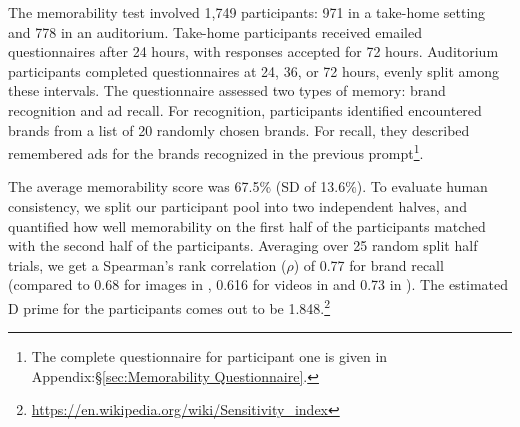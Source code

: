 The memorability test involved 1,749 participants: 971 in a take-home setting and 778 in an auditorium. Take-home participants received emailed questionnaires after 24 hours, with responses accepted for 72 hours. Auditorium participants completed questionnaires at 24, 36, or 72 hours, evenly split among these intervals. The questionnaire assessed two types of memory: brand recognition and ad recall. For recognition, participants identified encountered brands from a list of 20 randomly chosen brands. For recall, they described remembered ads for the brands recognized in the previous prompt\footnote{The complete questionnaire for participant one is given in Appendix:\S\ref{sec:Memorability Questionnaire}.}. 

The average memorability score was 67.5\% (SD of 13.6\%). 
To evaluate human consistency, we split our participant pool into two independent halves, and quantified how well memorability on the first half of the participants matched with the second half of the participants. Averaging over 25 random split half trials, we get a Spearman's rank correlation ($\rho$) of 0.77 for brand recall (compared to 0.68 for images in \cite{khosla2015understanding}, 0.616 for videos in \cite{cohendet2019videomem} and 0.73 in \cite{newman2020multimodal}). The estimated D prime for the participants comes out to be 1.848.\footnote{\url{https://en.wikipedia.org/wiki/Sensitivity_index}}




